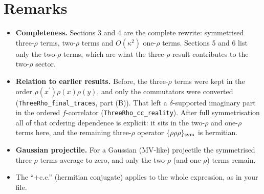 \documentclass[10pt]{article}
\numberwithin{equation}{section}
\begin{document}
\section{Remarks}
\begin{itemize}
\item \textbf{Completeness.} Sections 3 and 4 are the complete rewrite: symmetrised three-$\rho$ terms, two-$\rho$ terms and $O(\kappa^{2})$ one-$\rho$ terms. Sections 5 and 6 list only the two-$\rho$ terms, which are what the three-$\rho$ result contributes to the two-$\rho$ sector.
\item \textbf{Relation to earlier results.} Before, the three-$\rho$ terms were kept in the order $\rho(x^{\prime})\rho(x)\rho(y)$, and only the commutators were converted (\texttt{ThreeRho\_final\_traces}, part (B)). That left a $\delta$-supported imaginary part in the ordered $f$-correlator (\texttt{ThreeRho\_cc\_reality}). After full symmetrisation all of that ordering dependence is explicit: it sits in the two-$\rho$ and one-$\rho$ terms here, and the remaining three-$\rho$ operator $\{\rho\rho\rho\}_{\rm sym}$ is hermitian.
\item \textbf{Gaussian projectile.} For a Gaussian (MV-like) projectile the symmetrised three-$\rho$ terms average to zero, and only the two-$\rho$ (and one-$\rho$) terms remain.
\item The ``$+$c.c.'' (hermitian conjugate) applies to the whole expression, as in your file.
\end{itemize}
\end{document}
